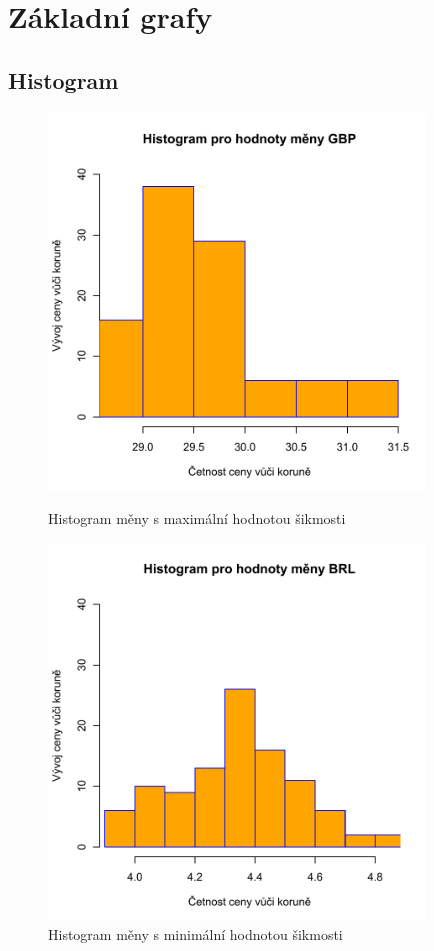 \documentclass[a4paper]{ article}
\begin{document}
\section{Základní grafy}
\subsection{Histogram}
\begin{figure}[H]
\centering
\includegraphics[width=10cm]{histogram_max.pdf}
\caption{Histogram měny s maximální hodnotou šikmosti}
\includegraphics[width=10cm]{histogram_min.pdf}
\caption{Histogram měny s minimální hodnotou šikmosti}
\end{figure}
\end{document}
